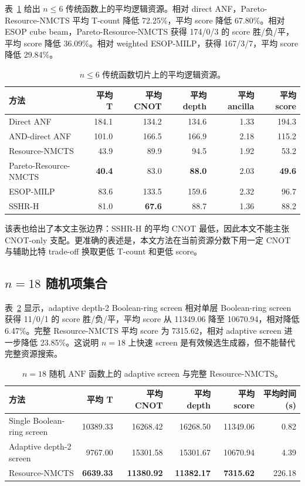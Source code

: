 \documentclass[UTF8,fontset=macnew,11pt]{ctexart}
\newcommand{\method}{Resource-NMCTS}
\newcommand{\pareto}{Pareto-Resource-NMCTS}
\newcommand{\screen}{Boolean-ring screen}
\newcommand{\anf}{\ensuremath{\mathrm{ANF}}}
\begin{document}
表~\ref{tab:traditional} 给出 $n\leq6$ 传统函数上的平均逻辑资源。相对 direct ANF，\pareto{} 平均 T-count 降低 72.25\%，平均 score 降低 67.80\%。相对 ESOP cube beam，\pareto{} 获得 174/0/3 的 score 胜/负/平，平均 score 降低 36.09\%。相对 weighted ESOP-MILP，获得 167/3/7，平均 score 降低 29.84\%。

\begin{table}[t]
\centering
\small
\caption{$n\leq6$ 传统函数切片上的平均逻辑资源。}
\label{tab:traditional}
\begin{tabular}{lrrrrr}
\toprule
方法 & 平均 T & 平均 CNOT & 平均 depth & 平均 ancilla & 平均 score \\
\midrule
Direct ANF & 184.1 & 134.2 & 134.6 & 1.33 & 194.3 \\
AND-direct ANF & 101.0 & 166.5 & 166.9 & 2.18 & 115.2 \\
\method{} & 43.9 & 89.9 & 94.5 & 1.92 & 53.2 \\
\pareto{} & \textbf{40.4} & 83.0 & \textbf{88.0} & 2.03 & \textbf{49.6} \\
ESOP-MILP & 83.6 & 133.5 & 159.6 & 2.32 & 96.7 \\
SSHR-H & 81.0 & \textbf{67.6} & 88.7 & 1.36 & 88.2 \\
\bottomrule
\end{tabular}
\end{table}

该表也给出了本文主张边界：SSHR-H 的平均 CNOT 最低，因此本文不能主张 CNOT-only 支配。更准确的表述是，本文方法在当前资源分数下用一定 CNOT 与辅助比特 trade-off 换取更低 T-count 和更低 score。

\subsection{\texorpdfstring{$n=18$}{n=18} 随机项集合}

表~\ref{tab:n18} 显示，adaptive depth-2 \screen{} 相对单层 \screen{} 获得 11/0/1 的 score 胜/负/平，平均 score 从 11349.06 降至 10670.94，相对降低 6.47\%。完整 \method{} 平均 score 为 7315.62，相对 adaptive screen 进一步降低 23.85\%。这说明 $n=18$ 上快速 screen 是有效候选生成器，但不能替代完整资源搜索。

\begin{table}[t]
\centering
\small
\caption{$n=18$ 随机 \anf{} 函数上的 adaptive screen 与完整 \method{}。}
\label{tab:n18}
\begin{tabular}{lrrrrr}
\toprule
方法 & 平均 T & 平均 CNOT & 平均 depth & 平均 score & 平均时间(s) \\
\midrule
Single \screen{} & 10389.33 & 16268.42 & 16268.50 & 11349.06 & 0.82 \\
Adaptive depth-2 screen & 9767.00 & 15301.58 & 15301.67 & 10670.94 & 4.39 \\
\method{} & \textbf{6639.33} & \textbf{11380.92} & \textbf{11382.17} & \textbf{7315.62} & 226.18 \\
\bottomrule
\end{tabular}
\end{table}
\end{document}
